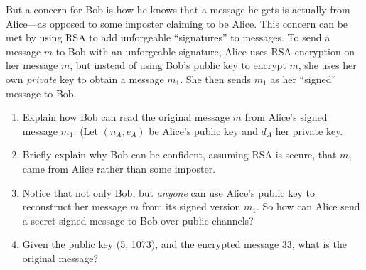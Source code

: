 \documentclass[12pt]{article}
\begin{document}
But a concern for Bob is how he knows that a message he gets is
actually from Alice---as opposed to some imposter claiming to be
Alice.  This concern can be met by using RSA to add unforgeable
``signatures'' to messages.  To send a message $m$ to Bob with an
unforgeable signature, Alice uses RSA encryption on her message $m$,
but instead of using Bob's public key to encrypt $m$, she uses her own
\emph{private} key to obtain a message $m_1$.  She then sends $m_1$ as
her ``signed'' message to Bob.

\begin{enumerate}[label=\textbf{(\alph*)}]

\item Explain how Bob can read the original message $m$ from Alice's signed message $m_1$.  (Let $(n_A,e_A)$ be Alice's public key and $d_A$ her private key. %


\item Briefly explain why Bob can be confident, assuming RSA is
secure, that $m_1$ came from Alice rather than some imposter.


\item Notice that not only Bob, but \emph{anyone} can use Alice's
public key to reconstruct her message $m$ from its signed version
$m_1$.  So how can Alice send a secret signed message to Bob over
public channels?


\item
Given the public key (5, 1073), and the encrypted message 33, 
what is the original message?


\end{enumerate}
\end{document}
